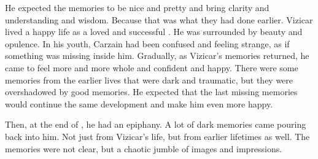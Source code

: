 He expected the memories to be nice and pretty and bring clarity and understanding and wisdom. 
Because that was what they had done earlier. 
Vizicar lived a happy life as a loved and successful \caliph. 
He was surrounded by beauty and opulence. 
In his youth, Carzain had been confused and feeling strange, as if something was missing inside him.
Gradually, as Vizicar's memories returned, he came to feel more and more whole and confident and happy. 
There were some memories from the earlier lives that were dark and traumatic, but they were overshadowed by good memories. 
He expected that the last missing memories would continue the same development and make him even more happy. 

Then, at the end of \TwilightAngelRememberEmph, he had an epiphany. 
A lot of dark memories came pouring back into him. 
Not just from Vizicar's life, but from earlier lifetimes as well. 
The memories were not clear, but a chaotic jumble of images and impressions. 

